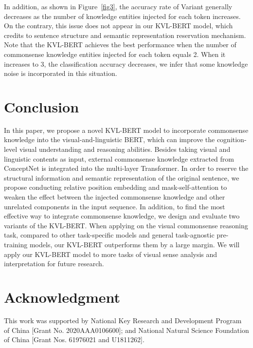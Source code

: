 \documentclass[conference]{IEEEtran}
\begin{document}
 
 

 
 
In addition, as shown in Figure~\ref{fig3}, the accuracy rate of Variant \uppercase\expandafter{} generally decreases as the number of  knowledge entities injected for each token increases. On the contrary, this issue does not appear in our KVL-BERT model, which credits to sentence structure and semantic representation reservation mechanism. Note that the KVL-BERT achieves the best performance when the number of commonsense knowledge entities injected for each token equals 2. When it increases to 3, the classification accuracy decreases, we infer that some knowledge noise is incorporated in this situation.
 













\section{Conclusion}
In this paper, we propose a novel KVL-BERT model to incorporate commonsense knowledge into the visual-and-linguistic BERT, which can improve the cognition-level visual understanding and reasoning abilities. Besides taking visual and linguistic contents as input, external commonsense knowledge extracted from ConceptNet is integrated into the multi-layer Transformer. In order to reserve the structural information and semantic representation of the original sentence, we propose conducting relative position embedding and mask-self-attention to weaken the effect between the injected commonsense knowledge and other unrelated components in the input sequence. In addition, to find the most effective way to integrate commonsense knowledge, we design and evaluate two variants of the KVL-BERT. When applying on the visual commonsense reasoning task, compared to other task-specific models and general task-agnostic pre-training models, our KVL-BERT outperforms them by a large margin. We will apply our KVL-BERT model to more tasks of visual sense analysis and interpretation for future research.

\section*{Acknowledgment}

This work was supported by National Key Research and Development Program of China [Grant No. 2020AAA0106600]; and National Natural Science Foundation of China [Grant Nos. 61976021 and U1811262].



\end{document}
